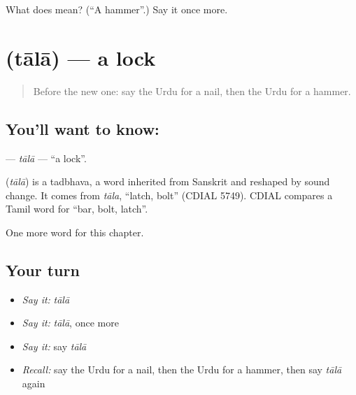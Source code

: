 \begin{tcolorbox}[breakable,colback=teal!4,colframe=teal!35!black,title={Before you move on}]
What does  mean? (\textquotedblleft{}A hammer\textquotedblright{}.) Say it once more.
\end{tcolorbox}
\section[\texorpdfstring{\ur{تالا} (tālā)}{تالا (tālā)}]{ (tālā) — a lock}

\label{lesson:UR-C108-tala}



\begin{quote}
Before the new one: say the Urdu for a nail, then the Urdu for a hammer.
\end{quote}

\subsection*{You'll want to know: }
\textbf{} — \emph{tālā} — \textquotedblleft{}a lock\textquotedblright{}.

\begin{cousinweb}
\textbf{} (\emph{tālā}) is a tadbhava, a word inherited from Sanskrit and reshaped by sound change. It comes from \emph{tāla}, \textquotedblleft{}latch, bolt\textquotedblright{} (CDIAL 5749). CDIAL compares a Tamil word for \textquotedblleft{}bar, bolt, latch\textquotedblright{}.
\end{cousinweb}

\begin{grammarlens}[title={What you've built}]
One more word for this chapter.
\end{grammarlens}

\subsection*{Your turn}
\begin{itemize}
\raggedright
  \item \emph{Say it:} \emph{tālā}
  \item \emph{Say it:} \emph{tālā}, once more
  \item \emph{Say it:} say \emph{tālā}
  \item \emph{Recall:} say the Urdu for a nail, then the Urdu for a hammer, then say \emph{tālā} again
\end{itemize}

